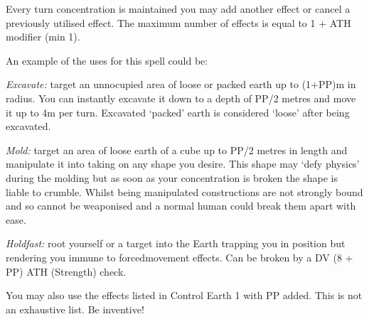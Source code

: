 \begin{multicols}{3}
{Every turn concentration is maintained you may add another effect\comma{} or cancel a previously utilised effect. The maximum number of effects is equal to 1 + ATH modifier (min 1). 

An example of the uses for this spell could be:
\begin{spellitemize}
\item {\it Excavate:} target an unnocupied area of loose or packed earth up to (1+PP)m in radius. You can instantly excavate it down to a depth of PP/2 metres\comma{} and move it up to 4m per turn. Excavated `packed' earth is considered `loose' after being excavated. 
\item {\it Mold:} target an area of loose earth of a cube up to PP/2 metres in length and manipulate it into taking on any shape you desire. This shape may `defy physics' during the molding\comma{} but as soon as your concentration is broken\comma{} the shape is liable to crumble. Whilst being manipulated\comma{} constructions are not strongly bound\comma{} and so cannot be weaponised\comma{} and a normal human could break them apart with ease. 
\item {\it Holdfast:} root yourself or a target into the Earth\comma{} trapping you in position\comma{} but rendering you immune to forced\minus{}movement effects. Can be broken by a DV (8 + PP) ATH (Strength) check.  
\end{spellitemize}You may also use the effects listed in Control Earth 1 with \PPDifference{\DVNov}{\DVBeg} PP added. 
This is not an exhaustive list. Be inventive!}
\end{multicols}
